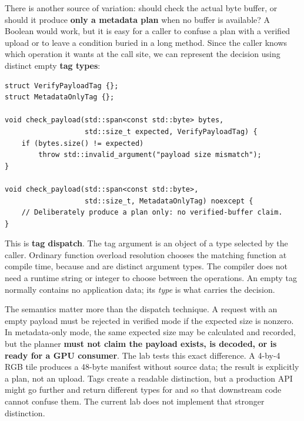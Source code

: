 \hypertarget{01-foundations-i-ch005-the-same-operation-can-be-verified-or-merely-describedwithout-a-boolean-flag}{}

There is another source of variation: should  check the actual byte buffer, or should it produce \textbf{only a metadata plan} when no buffer is available? A Boolean  would work, but it is easy for a caller to confuse a plan with a verified upload or to leave a condition buried in a long method. Since the caller knows which operation it wants at the call site, we can represent the decision using distinct empty \textbf{tag types}:

\begin{verbatim}
struct VerifyPayloadTag {};
struct MetadataOnlyTag {};

void check_payload(std::span<const std::byte> bytes,
                   std::size_t expected, VerifyPayloadTag) {
    if (bytes.size() != expected)
        throw std::invalid_argument("payload size mismatch");
}

void check_payload(std::span<const std::byte>,
                   std::size_t, MetadataOnlyTag) noexcept {
    // Deliberately produce a plan only: no verified-buffer claim.
}
\end{verbatim}

This is \textbf{tag dispatch}. The tag argument is an object of a type selected by the caller. Ordinary function overload resolution chooses the matching function at compile time, because  and  are distinct argument types. The compiler does not need a runtime string or integer to choose between the operations. An empty tag normally contains no application data; its \emph{type} is what carries the decision.

The semantics matter more than the dispatch technique. A request with an empty payload must be rejected in verified mode if the expected size is nonzero. In metadata-only mode, the same expected size may be calculated and recorded, but the planner \textbf{must not claim the payload exists, is decoded, or is ready for a GPU consumer}. The lab tests this exact difference. A 4-by-4 RGB tile produces a 48-byte manifest without source data; the result is explicitly a plan, not an upload. Tags create a readable distinction, but a production API might go further and return different types for  and  so that downstream code cannot confuse them. The current lab does not implement that stronger distinction.

